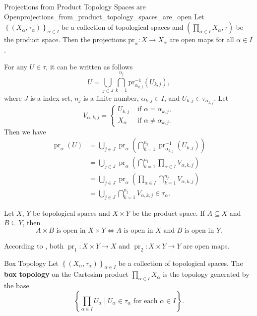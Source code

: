 \documentclass{report}
\begin{document}
\begin{proposition}{Projections from Product Topology Spaces are Open}{projections_from_product_topology_spaces_are_open}
	Let $\left\{(X_\alpha,\tau_\alpha)\right\}_{\alpha\in I}$ be a collection of topological spaces and $\left(\prod_{\alpha\in I}X_\alpha,\tau\right)$ be the product space. Then the projections $\mathrm{pr}_\alpha:X\to X_\alpha$ are open maps for all $\alpha\in I$.
\end{proposition}
\begin{prf}
	For any $U\in \tau$, it can be written as follows
	\[
		U = \bigcup_{j \in J} \bigcap_{k  = 1}^{n_j} \mathrm{pr}_{\alpha_{k, j} }^{-1}\left(U_{k, j} \right),
	\]
	where $J$ is a index set, $n_j$ is a finite number, $\alpha_{k, j} \in I$, and $U_{k, j} \in \tau_{\alpha_{k, j}}$. Let
	\[
		V_{\alpha, k, j} = \begin{cases}
			U_{k, j} & \text{ if } \alpha = \alpha_{k, j}, \\
			 X_{\alpha} & \text{ if }\alpha \ne \alpha_{k, j} .
			\end{cases}
	\]
	Then we have
	\begin{align*}
		\operatorname{pr}_\alpha(U)&=\bigcup_{j \in J} \operatorname{pr}_\alpha\left(\bigcap_{k=1}^{n_j} \operatorname{pr}_{\alpha_{k,j}}^{-1}\left(U_{k,j}\right)\right)\\
		&=\bigcup_{j \in J} \operatorname{pr}_\alpha\left(\bigcap_{k=1}^{n_j} \prod_{\alpha\in I}V_{\alpha,k,j}\right)\\
		&=\bigcup_{j \in J} \operatorname{pr}_\alpha\left(\prod_{\alpha\in I}\bigcap_{k=1}^{n_j} V_{\alpha,k,j}\right)\\
		&=\bigcup_{j \in J} \bigcap_{k=1}^{n_j} V_{\alpha,k,j}\in \tau_\alpha.
	\end{align*}
\end{prf}
\begin{corollary}{}{}
	Let $X$, $Y$ be topological spaces and $X\times Y$ be the product space. If $A\subseteq X$ and $B\subseteq Y$, then 
	\[
		A\times B\text{ is open in }X\times Y\iff A\text{ is open in }X\text{ and }B\text{ is open in }Y.
	\]
\end{corollary}
\begin{prf}
	According to , both $\operatorname{pr}_1:X\times Y\to X$ and $\operatorname{pr}_2:X\times Y\to Y$ are open maps.
\end{prf}

\begin{definition}{Box Topology}{}
	Let $\left\{(X_\alpha,\tau_\alpha)\right\}_{\alpha\in I}$ be a collection of topological spaces. The \textbf{box topology} on the Cartesian product $\prod_{\alpha\in I}X_\alpha$ is the topology generated by the base
	\[
		\left\{\prod_{\alpha\in I}U_\alpha\mid U_\alpha\in \tau_\alpha\text{ for each }\alpha\in I\right\}.
	\]
\end{definition}
\end{document}
